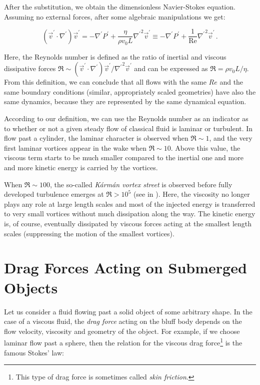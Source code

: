 After the substitution, we obtain the dimensionless Navier-Stokes equation. Assuming no external forces, after some algebraic manipulations we get:

\begin{equation}
(\vec{v}^{\prime}\cdot \nabla^{\prime})\vec{v}^{\prime}
= -\nabla^{\prime} P^{\prime}
+ \frac{\eta}{\rho v_0 L} {\nabla^{\prime}}^2 \vec{v}^{\prime}
\equiv -\nabla^{\prime} P^{\prime}
+ \frac{1}{\text{Re}} {\nabla^{\prime}}^2 \vec{v}^{\prime}\,.
\label{reynolds}
\end{equation}

Here, the Reynolds number is defined as the ratio of inertial and viscous dissipative forces  $\Re \sim (\vec{v}^{\prime}\cdot \nabla^{\prime})\vec{v}^{\prime} / {\nabla^{\prime}}^2 \vec{v}^{\prime}$ and can be expressed as $\Re = \rho v_0 L / \eta$. From this definition, we can conclude that all flows with the same $\unit{Re}$ and the same boundary conditions (similar, appropriately scaled geometries) have also the same dynamics, because they are represented by the same dynamical equation.

According to our definition, we can use the Reynolds number as an indicator as to whether or not a given steady flow of classical fluid is laminar or turbulent. In flow past a cylinder, the laminar character is observed when $\Re\sim 1$, and the very first laminar vortices appear in the wake when $\Re\sim 10$. Above this value, the viscous term starts to be much smaller compared to the inertial one and more and more kinetic energy is carried by the vortices.

When $\Re \sim 100$, the so-called \textit{K\'arm\'an vortex street} is observed before fully developed turbulence emerges at $\Re > 10^5$ (see in \cite{turbulence}). Here, the viscosity no longer plays any role at large length scales and most of the injected energy is transferred to very small vortices without much dissipation along the way. The kinetic energy is, of course, eventually dissipated by viscous forces acting at the smallest length scales (suppressing the motion of the smallest vortices).


\section{Drag Forces Acting on Submerged Objects}

Let us consider a fluid flowing past a solid object of some arbitrary shape. In the case of a viscous fluid, the \textit{drag force} acting on the bluff body depends on the flow velocity, viscosity and geometry of the object. For example, if we choose laminar flow past a sphere, then the relation for the viscous drag force\footnote{This type of drag force is sometimes called \textit{skin friction}.} is the famous Stokes' law:

